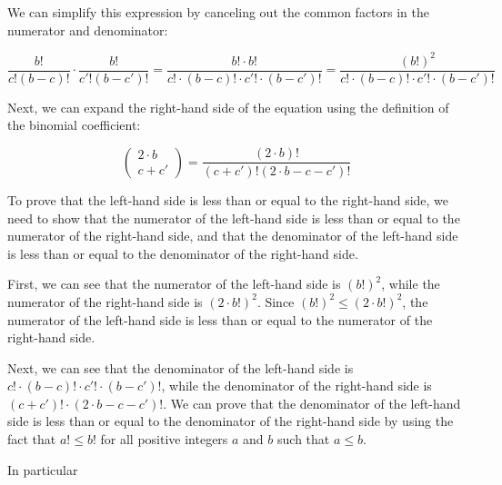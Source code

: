 \begin{solution}
We can simplify this expression by canceling out the common factors in the numerator and denominator:

\begin{equation}
\frac{b!}{c!(b - c)!} \cdot \frac{b!}{c'!(b - c')!}
= \frac{b! \cdot b!}{c! \cdot (b - c)! \cdot c'! \cdot (b - c')!}
= \frac{(b!)^2}{c! \cdot (b - c)! \cdot c'! \cdot (b - c')!}
\end{equation}

Next, we can expand the right-hand side of the equation using the definition of the binomial coefficient:

\begin{equation}
\begin{pmatrix}
2 \cdot b\\c + c'
\end{pmatrix}
= \frac{(2 \cdot b)!}{(c + c')!(2 \cdot b - c - c')!}
\end{equation}

To prove that the left-hand side is less than or equal to the right-hand side, we need to show that the numerator of the left-hand side is less than or equal to the numerator of the right-hand side, and that the denominator of the left-hand side is less than or equal to the denominator of the right-hand side.

First, we can see that the numerator of the left-hand side is $(b!)^2$, while the numerator of the right-hand side is $(2 \cdot b!)^2$. Since $(b!)^2 \leq (2 \cdot b!)^2$, the numerator of the left-hand side is less than or equal to the numerator of the right-hand side.

Next, we can see that the denominator of the left-hand side is $c! \cdot (b - c)! \cdot c'! \cdot (b - c')!$, while the denominator of the right-hand side is $(c + c')! \cdot (2 \cdot b - c - c')!$. We can prove that the denominator of the left-hand side is less than or equal to the denominator of the right-hand side by using the fact that $a! \leq b!$ for all positive integers $a$ and $b$ such that $a \leq b$.

In particular







\end{solution}